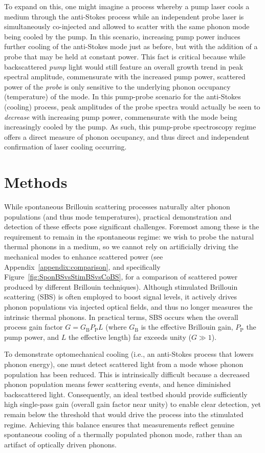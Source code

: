 To expand on this, one might imagine a process whereby a pump laser cools a medium through the anti-Stokes process while an independent probe laser is simultaneously co-injected and allowed to scatter with the same phonon mode being cooled by the pump. In this scenario, increasing pump power induces further cooling of the anti-Stokes mode just as before, but with the addition of a probe that may be held at constant power. This fact is critical because while backscattered \emph{pump} light would still feature an overall growth trend in peak spectral amplitude, commensurate with the increased pump power, scattered power of the \emph{probe} is only sensitive to the underlying phonon occupancy (temperature) of the mode. In this pump-probe scenario for the anti-Stokes (cooling) process, peak amplitudes of the probe spectra would actually be seen to \emph{decrease} with increasing pump power, commensurate with the mode being increasingly cooled by the pump. As such, this pump-probe spectroscopy regime offers a direct measure of phonon occupancy, and thus direct and independent confirmation of laser cooling occurring.

\section{Methods}
\label{Cooling:sec:Methods}

While spontaneous Brillouin scattering processes naturally alter phonon populations (and thus mode temperatures), practical demonstration and detection of these effects pose significant challenges. Foremost among these is the requirement to remain in the spontaneous regime: we wish to probe the natural thermal phonons in a medium, so we cannot rely on artificially driving the mechanical modes to enhance scattered power (see Appendix~\ref{appendix:comparison}, and specifically Figure~\ref{fig:SponBSvsStimBSvsCoBS}, for a comparison of scattered power produced by different Brillouin techniques). Although stimulated Brillouin scattering (SBS) is often employed to boost signal levels, it actively drives phonon populations via injected optical fields, and thus no longer measures the intrinsic thermal phonons. In practical terms, SBS occurs when the overall process gain factor \(G = G_{\mathrm{B}}P_{\mathrm{P}}L\) (where \(G_{\mathrm{B}}\) is the effective Brillouin gain, \(P_{\mathrm{P}}\) the pump power, and \(L\) the effective length) far exceeds unity (\(G \gg 1\)).

To demonstrate optomechanical cooling (i.e., an anti-Stokes process that lowers phonon energy), one must detect scattered light from a mode whose phonon population has been reduced. This is intrinsically difficult because a decreased phonon population means fewer scattering events, and hence diminished backscattered light. Consequently, an ideal testbed should provide sufficiently high single-pass gain (overall gain factor near unity) to enable clear detection, yet remain below the threshold that would drive the process into the stimulated regime. Achieving this balance ensures that measurements reflect genuine spontaneous cooling of a thermally populated phonon mode, rather than an artifact of optically driven phonons.


